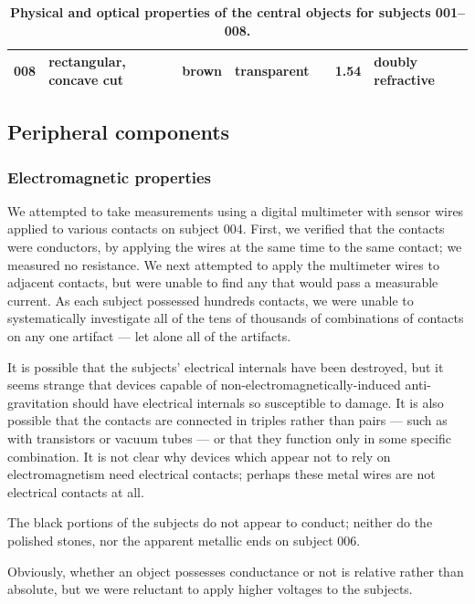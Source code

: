 \documentclass[10pt]{article}
\theoremstyle{definition}
\begin{document}
\begin{table}[h]
{\begin{tabular}{lp{5em}rrrrp{7.5em}}
\textbf{008}                                & rectangular, concave cut           & brown                                      & transparent                               &  & 1.54                                          & doubly refractive                            \\ \hline
\end{tabular}}
\caption{\label{tab:gem_properties}\textbf{Physical and optical properties of the central objects for subjects 001--008.}}
\end{table}

\subsection{Peripheral components}
\subsubsection{Electromagnetic properties}
We attempted to take measurements using a digital multimeter with sensor wires applied to various contacts on subject 004.
First, we verified that the contacts were conductors, by applying the wires at the same time to the same contact; we measured no resistance.
We next attempted to apply the multimeter wires to adjacent contacts, but were unable to find any that would pass a measurable current.
As each subject possessed hundreds contacts, we were unable to systematically investigate all of the tens of thousands of combinations of contacts on any one artifact --- let alone all of the artifacts.

It is possible that the subjects' electrical internals have been destroyed, but it seems strange that devices capable of non-electromagnetically-induced anti-gravitation should have electrical internals so susceptible to damage.
It is also possible that the contacts are connected in triples rather than pairs --- such as with transistors or vacuum tubes --- or that they function only in some specific combination.
It is not clear why devices which appear not to rely on electromagnetism need electrical contacts; perhaps these metal wires are not electrical contacts at all.

The black portions of the subjects do not appear to conduct; neither do the polished stones, nor the apparent metallic ends on subject 006.

Obviously, whether an object possesses conductance or not is relative rather than absolute, but we were reluctant to apply higher voltages to the subjects.
\end{document}
